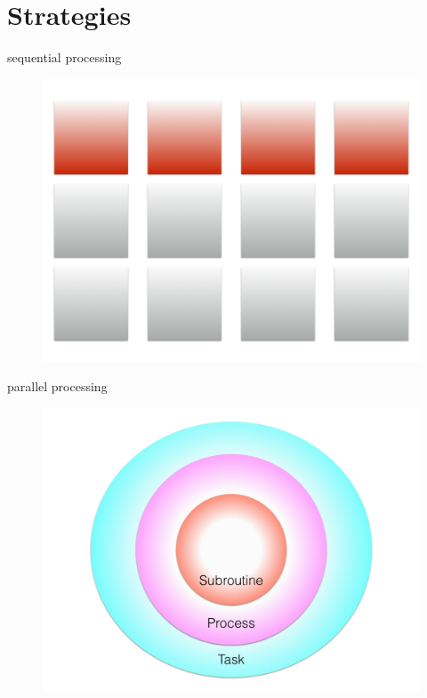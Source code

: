 \documentclass{beamer}
\begin{document}
\section{Strategies}

\begin{frame}{sequential processing}
    \begin{figure}
        \centering
        \includegraphics[width=\textwidth]{chunk.png}
    \end{figure}
\end{frame}

\begin{frame}{parallel processing}
    \begin{figure}
        \centering
        \includegraphics[width=\textwidth]{parallel.png}
    \end{figure}
\end{frame}
\end{document}
